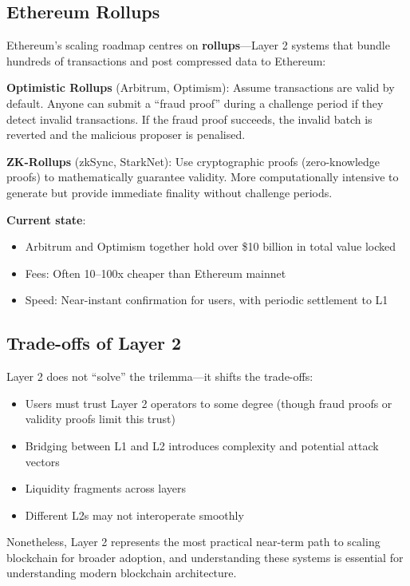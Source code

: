 \documentclass[11pt,a4paper]{article}
\newcommand{\keyword}[1]{\textbf{\textcolor{AccentOrange}{#1}}}
\begin{document}
\subsection{Ethereum Rollups}

Ethereum's scaling roadmap centres on \keyword{rollups}---Layer 2 systems that bundle hundreds of transactions and post compressed data to Ethereum:

\textbf{Optimistic Rollups} (Arbitrum, Optimism): Assume transactions are valid by default. Anyone can submit a ``fraud proof'' during a challenge period if they detect invalid transactions. If the fraud proof succeeds, the invalid batch is reverted and the malicious proposer is penalised.

\textbf{ZK-Rollups} (zkSync, StarkNet): Use cryptographic proofs (zero-knowledge proofs) to mathematically guarantee validity. More computationally intensive to generate but provide immediate finality without challenge periods.

\textbf{Current state}:
\begin{itemize}
    \item Arbitrum and Optimism together hold over \$10 billion in total value locked
    \item Fees: Often 10--100x cheaper than Ethereum mainnet
    \item Speed: Near-instant confirmation for users, with periodic settlement to L1
\end{itemize}

\subsection{Trade-offs of Layer 2}

Layer 2 does not ``solve'' the trilemma---it shifts the trade-offs:

\begin{itemize}
    \item Users must trust Layer 2 operators to some degree (though fraud proofs or validity proofs limit this trust)
    \item Bridging between L1 and L2 introduces complexity and potential attack vectors
    \item Liquidity fragments across layers
    \item Different L2s may not interoperate smoothly
\end{itemize}

Nonetheless, Layer 2 represents the most practical near-term path to scaling blockchain for broader adoption, and understanding these systems is essential for understanding modern blockchain architecture.
\end{document}
